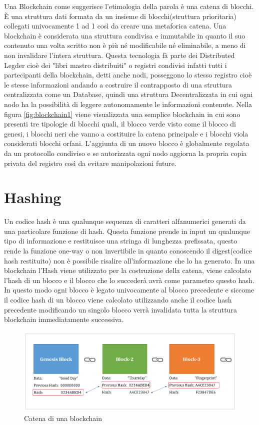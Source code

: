 \documentclass[a4paper]{report}
\begin{document}
Una Blockchain come suggerisce l'etimologia della parola è una catena di blocchi. È una struttura dati formata da un insieme di blocchi(struttura prioritaria) collegati univocamente 1 ad 1 così da creare una metaforica catena. Una blockchain è considerata una struttura condivisa e immutabile in quanto il suo contenuto una volta scritto non è più né modificabile né eliminabile, a meno di non invalidare l'intera struttura. Questa tecnologia fà parte dei Distributed Legder cioè dei "libri mastro distribuiti" o registri condivisi infatti tutti i partecipanti della blockchain, detti anche nodi, posseggono lo stesso registro cioè le stesse informazioni andando a costruire il contrapposto di una struttura centralizzata come un Database, quindi una struttura Decentralizzata in cui ogni nodo ha la possibilità di leggere autonomamente le informazioni contenute.
Nella figura \ref{fig:blockchain1} viene visualizzata una semplice blockchain in cui sono presenti tre tipologie di blocchi quali, il blocco verde visto come il blocco di genesi, i blocchi neri che vanno a costituire la catena principale e i blocchi viola considerati blocchi orfani. L'aggiunta di un nuovo blocco è globalmente regolata da un protocollo condiviso e se autorizzata ogni nodo aggiorna la propria copia privata del registro così da evitare manipolazioni future.

\section{Hashing}
Un codice hash è una qualunque sequenza di caratteri alfanumerici generati da una particolare funzione di hash. Questa funzione prende in input un qualunque tipo di informazione e restituisce una stringa di lunghezza prefissata, questo rende la funzione one-way o non invertibile in quanto conoscendo il digest(codice hash restituito) non è possibile risalire all'informazione che lo ha generato. In una blockchain l'Hash viene utilizzato per la costruzione della catena, viene calcolato l'hash di un blocco e il blocco che lo succederà avrà come parametro questo hash. In questo modo ogni blocco è legato univocamente al blocco precedente e siccome il codice hash di un blocco viene calcolato utilizzando anche il codice hash precedente modificando un singolo blocco verrà invalidata tutta la struttura blockchain immediatamente successiva.
\begin{figure}[h]
	\includegraphics[width=\textwidth]{bc1}
	\centering
	\caption{Catena di una blockchain}
	\label{fig:blockchain2}
\end{figure}
\end{document}
